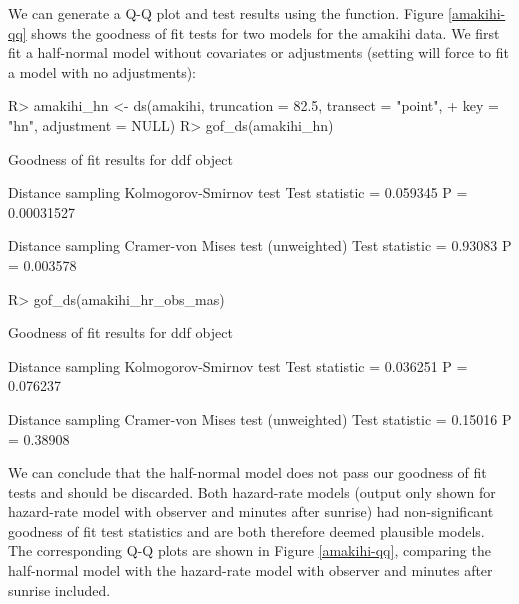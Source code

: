\documentclass[article]{jss}
\begin{document}
We can generate a Q-Q plot and test results using the  function. Figure \ref{amakihi-qq} shows the goodness of fit tests for two models for the amakihi data. We first fit a half-normal model without covariates or adjustments (setting  will force  to fit a model with no adjustments):
\begin{Schunk}
\begin{Sinput}
R> amakihi_hn <- ds(amakihi, truncation = 82.5, transect = "point",
+                  key = "hn", adjustment = NULL)
R> gof_ds(amakihi_hn)
\end{Sinput}
\begin{Soutput}
Goodness of fit results for ddf object

Distance sampling Kolmogorov-Smirnov test
Test statistic =  0.059345  P =  0.00031527 

Distance sampling Cramer-von Mises test (unweighted)
Test statistic =  0.93083  P =  0.003578 
\end{Soutput}
\begin{Sinput}
R> gof_ds(amakihi_hr_obs_mas)
\end{Sinput}
\begin{Soutput}
Goodness of fit results for ddf object

Distance sampling Kolmogorov-Smirnov test
Test statistic =  0.036251  P =  0.076237 

Distance sampling Cramer-von Mises test (unweighted)
Test statistic =  0.15016  P =  0.38908 
\end{Soutput}
\end{Schunk}
We can conclude that the half-normal model does not pass our goodness of fit tests and should be discarded. Both hazard-rate models (output only shown for hazard-rate model with observer and minutes after sunrise) had non-significant goodness of fit test statistics and are both therefore deemed plausible models. The corresponding Q-Q plots are shown in Figure \ref{amakihi-qq}, comparing the half-normal model with the hazard-rate model with observer and minutes after sunrise included.
\end{document}
